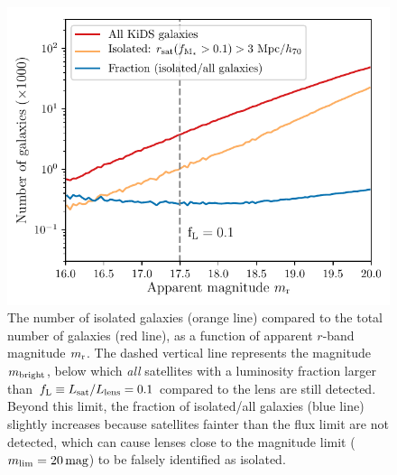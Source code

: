 \documentclass[usenatbib]{mnras}
\newcommand{\magn}{\, {\rm mag} }
\newcommand{\un}[1]{_{\rm #1}}
\begin{document}
\begin{figure}
	\includegraphics[width=1.0\columnwidth]{Figures/isolation_test_kids_perc0p1-3Mpc.pdf}
	\caption{The number of isolated galaxies (orange line) compared to the total number of galaxies (red line), as a function of apparent $r$-band magnitude $m\un{r}$. The dashed vertical line represents the magnitude $m\un{bright}$, below which \emph{all} satellites with a luminosity fraction larger than $f\un{L} \equiv L\un{sat}/L\un{lens}=0.1$ compared to the lens are still detected. Beyond this limit, the fraction of isolated/all galaxies (blue line) slightly increases because satellites fainter than the flux limit are not detected, which can cause lenses close to the magnitude limit ($m\un{lim}=20 \magn$) to be falsely identified as isolated.}
	\label{fig:isolation_test_fraction}
\end{figure}
\end{document}
